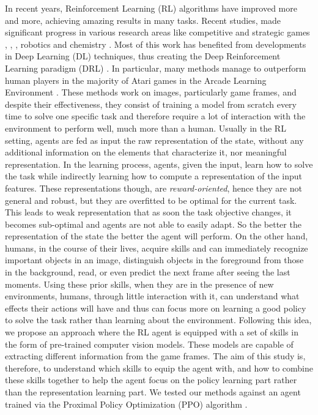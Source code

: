 In recent years, Reinforcement Learning (RL) \cite{sutton1998introduction} algorithms have improved more and more, achieving amazing results in many tasks.
Recent studies, made significant progress in various research areas like competitive and strategic games \cite{mnih2013playing}, \cite{badia2020agent57}, \cite{vinyals2019grandmaster}, robotics \cite{bousmalis2023robocat} and chemistry \cite{varadi2022alphafold}.
Most of this work has benefited from developments in Deep Learning (DL) techniques, thus creating the Deep Reinforcement Learning paradigm (DRL) \cite{zhang2020deep}.
In particular, many methods manage to outperform human players in the majority of Atari games in the Arcade Learning Environment \cite{bellemare13arcade}.
These methods work on images, particularly game frames, and despite their effectiveness, they consist of training a model from scratch every time to solve one specific task and therefore require a lot of interaction with the environment to perform well, much more than a human.
Usually in the RL setting, agents are fed as input the raw representation of the state, without any additional information on the elements that characterize it, nor meaningful representation. In the learning process, agents, given the input, learn how to solve the task while indirectly learning how to compute a representation of the input features. These representations though, are \textit{reward-oriented}, hence they are not general and robust, but they are overfitted to be optimal for the current task. This leads to weak representation that as soon the task objective changes, it becomes sub-optimal and agents are not able to easily adapt. So the better the representation of the state the better the agent will perform.
On the other hand, humans, in the course of their lives, acquire skills and can immediately recognize important objects in an image, distinguish objects in the foreground from those in the background, read, or even predict the next frame after seeing the last moments.
Using these prior skills, when they are in the presence of new environments, humans, through little interaction with it, can understand what effects their actions will have and thus can focus more on learning a good policy to solve the task rather than learning about the environment.
Following this idea, we propose an approach where the RL agent is equipped with a set of skills in the form of pre-trained computer vision models. These models are capable of extracting different information from the game frames.
The aim of this study is, therefore, to understand which skills to equip the agent with, and how to combine these skills together to help the agent focus on the policy learning part rather than the representation learning part.
We tested our methods against an agent trained via the Proximal Policy Optimization (PPO) algorithm \cite{schulman2017proximal}.


